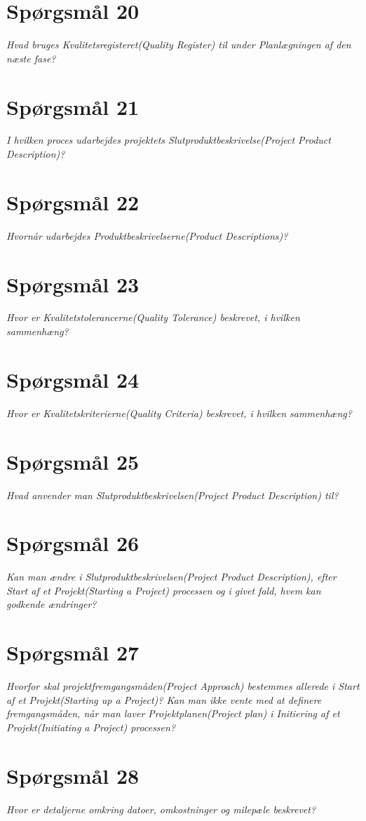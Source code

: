 \section{Spørgsmål 20}
\textit{Hvad bruges Kvalitetsregisteret(Quality Register) til under Planlægningen af den næste fase?}
\section{Spørgsmål 21}
\textit{I hvilken proces udarbejdes projektets Slutproduktbeskrivelse(Project Product Description)?}
\section{Spørgsmål 22}
\textit{Hvornår udarbejdes Produktbeskrivelserne(Product Descriptions)?}
\section{Spørgsmål 23}
\textit{Hvor er Kvalitetstolerancerne(Quality Tolerance) beskrevet, i hvilken sammenhæng?}
\section{Spørgsmål 24}
\textit{Hvor er Kvalitetskriterierne(Quality Criteria) beskrevet, i hvilken sammenhæng?}
\section{Spørgsmål 25}
\textit{Hvad anvender man Slutproduktbeskrivelsen(Project Product Description) til?}
\section{Spørgsmål 26}
\textit{Kan man ændre i Slutproduktbeskrivelsen(Project Product Description), efter Start af et Projekt(Starting a Project) processen og i givet fald, hvem kan godkende ændringer?}
\section{Spørgsmål 27}
\textit{Hvorfor skal projektfremgangsmåden(Project Approach) bestemmes allerede i Start af et Projekt(Starting up a Project)? Kan man ikke vente med at definere fremgangsmåden, når man laver Projektplanen(Project plan) i Initiering af et Projekt(Initiating a Project) processen?}
\section{Spørgsmål 28}
\textit{Hvor er detaljerne omkring datoer, omkostninger og milepæle beskrevet?}
